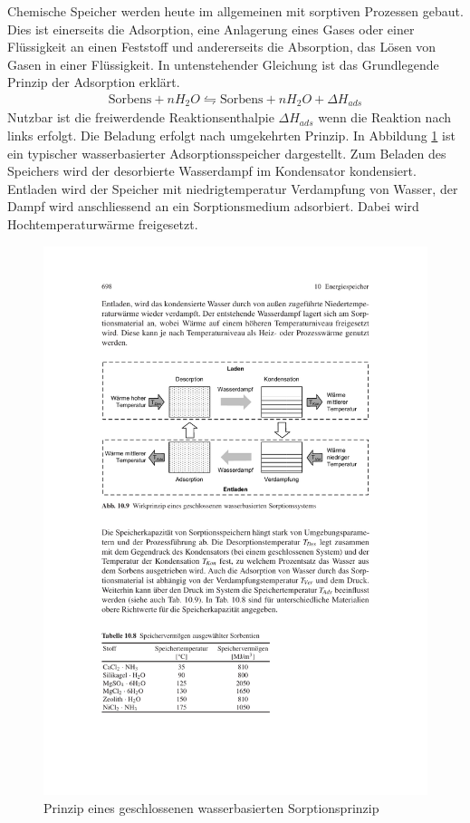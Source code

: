 \documentclass[11pt,a4paper]{scrartcl}
\begin{document}
Chemische Speicher werden heute im allgemeinen mit sorptiven Prozessen gebaut.
Dies ist einerseits die Adsorption, eine Anlagerung eines Gases oder einer
Flüssigkeit an einen Feststoff und andererseits die Absorption, das Lösen von
Gasen in einer Flüssigkeit. In untenstehender Gleichung ist das Grundlegende
Prinzip der Adsorption erklärt.
\begin{align}
\text{Sorbens}+nH_2O\leftrightharpoons \text{Sorbens}+nH_2O+\Delta H_{ads}
\end{align}
Nutzbar ist die freiwerdende Reaktionsenthalpie $\Delta H_{ads}$ wenn die
Reaktion nach links erfolgt. Die Beladung erfolgt nach umgekehrten Prinzip.
In Abbildung \ref{fig:Sorption} ist ein typischer wasserbasierter
Adsorptionsspeicher dargestellt. Zum Beladen des Speichers wird der desorbierte
Wasserdampf im Kondensator kondensiert. Entladen wird der Speicher mit
niedrigtemperatur Verdampfung von Wasser, der Dampf wird anschliessend an ein
Sorptionsmedium adsorbiert. Dabei wird Hochtemperaturwärme freigesetzt.
\cite{Wesselak}

\begin{figure}[h]
\begin{center}
\includegraphics[scale=1]{images/sorption.pdf}
\caption{Prinzip eines geschlossenen wasserbasierten Sorptionsprinzip
\cite{Wesselak}}
\label{fig:Sorption}
\end{center}
\end{figure}
\end{document}

